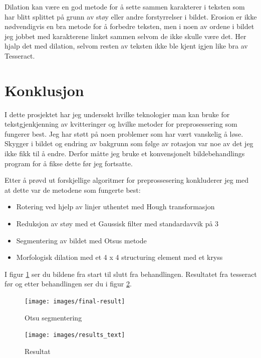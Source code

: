 \documentclass{article}
\begin{document}
Dilation kan være en god metode for å sette sammen karakterer i teksten som har blitt splittet på grunn av støy eller andre forstyrrelser i bildet.
Erosion er ikke nødvendigvis en bra metode for å forbedre teksten, men i noen av ordene i bildet jeg jobbet med karakterene linket sammen selvom de ikke skulle være det. Her hjalp det med dilation, selvom resten av teksten ikke ble kjent igjen like bra av Tesseract.

\section{Konklusjon}
I dette prosjektet har jeg undersøkt hvilke teknologier man kan bruke for tekstgjenkjenning av kvitteringer og hvilke metoder for preprosessering som fungerer best. Jeg har støtt på noen problemer som har vært vanskelig å løse. Skygger i bildet og endring av bakgrunn som følge av rotasjon var noe av det jeg ikke fikk til å endre. Derfor måtte jeg bruke et konvensjonelt bildebehandlings program for å fikse dette før jeg fortsatte.

Etter å prøvd ut forskjellige algoritmer for preprossesering konkluderer jeg med at dette var de metodene som fungerte best:
\begin{itemize}
\item Rotering ved hjelp av linjer uthentet med Hough transformasjon
\item Reduksjon av støy med et Gaussisk filter med standardavvik på 3
\item Segmentering av bildet med Otsus metode
\item Morfologisk dilation med et 4 x 4 structuring element med et kryss
\end{itemize}

I figur \ref{fig:final-res} ser du bildene fra start til slutt fra behandlingen. Resultatet fra tesseract før og etter behandlingen ser du i figur \ref{fig:tesseract-res}.
\begin{figure}[h]
\centering
\texttt{[image: images/final-result]}
\caption{Otsu segmentering}
\label{fig:final-res}
\end{figure}


\begin{figure}[h]
\centering
\texttt{[image: images/results\_text]}
\caption{Resultat}
\label{fig:tesseract-res}
\end{figure}
\end{document}
